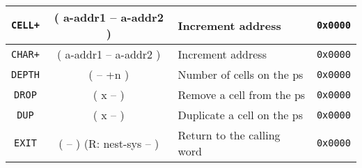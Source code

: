 \begin{center}
\begin{longtable}{|c|c|l|c|}
      \texttt{CELL+}                          &
      ( a-addr1 -- a-addr2 )                  &
      Increment address                       &
      \texttt{0x0000}                           \\ \hline
                                              
                                              
      \texttt{CHAR+}                          &
      ( a-addr1 -- a-addr2 )                  &
      Increment address                       &
      \texttt{0x0000}                           \\ \hline


      \texttt{DEPTH}                          &
      ( -- +n )                               &
      Number of cells on the \gls{ps}         &
      \texttt{0x0000}                           \\ \hline
                                              
      \texttt{DROP}                           &
      ( x -- )                                &
      Remove a cell from the \gls{ps}         &
      \texttt{0x0000}                           \\ \hline
                                              
      \texttt{DUP}                            &
      ( x -- )                                &
      Duplicate a cell on the \gls{ps}        &
      \texttt{0x0000}                           \\ \hline
                                              
      \texttt{EXIT}                           &
      ( -- ) (R: nest-sys -- )                &
      Return to the calling word              &
      \texttt{0x0000}                           \\ \hline


\end{longtable}
\end{center}
